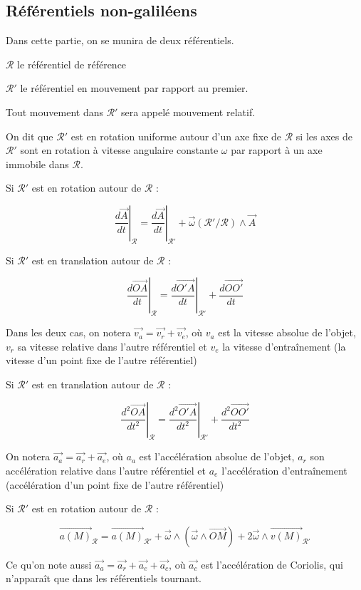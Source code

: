 \documentclass[a4paper,12pt]{book}
\newcommand{\Def}[2]{\begin{tcolorbox}[colback=white,colframe=red!10!green!20!blue!75!, title=Définition : #1]#2\end{tcolorbox}}
\newcommand{\Thr}[2]{\begin{tcolorbox}[sharp corners, colback=white,colframe=red!10!blue!30!green!75!, title=Théorème : #1]#2\end{tcolorbox}}
\renewcommand{\Vec}[1]{\overrightarrow{#1}}
\begin{document}
\subsection{Référentiels non-galiléens}
\Def{Référentiels}{Dans cette partie, on se munira de deux référentiels.
\par $\mathcal{R}$ le référentiel de référence
\par $\mathcal{R}'$ le référentiel en mouvement par rapport au premier.
\par Tout mouvement dans $\mathcal{R}'$ sera appelé mouvement relatif.
\par On dit que $\mathcal{R}'$ est en rotation uniforme autour d'un axe fixe de $\mathcal{R}$ si les axes de $\mathcal{R}'$ sont en rotation à vitesse angulaire constante $\omega$ par rapport à un axe immobile dans $\mathcal{R}$.}
\Thr{Composition des vitesses}{Si $\mathcal{R}'$ est en rotation autour de $\mathcal{R}$ :
\par $$\left.\dfrac{d\Vec{A}}{dt}\right|_\mathcal{R} = \left.\dfrac{d\Vec{A}}{dt}\right|_{\mathcal{R}'}+\Vec{\omega}(\mathcal{R}'/\mathcal{R})\wedge\Vec{A}$$
\par Si $\mathcal{R}'$ est en translation autour de $\mathcal{R}$ :
\par $$\left.\dfrac{d\Vec{OA}}{dt}\right|_\mathcal{R} = \left.\dfrac{d\Vec{O'A}}{dt}\right|_{\mathcal{R}'}+\dfrac{d\vec{OO'}}{dt}$$
\par Dans les deux cas, on notera $\Vec{v_a} = \Vec{v_r}+\Vec{v_e}$, où $v_a$ est la vitesse absolue de l'objet, $v_r$ sa vitesse relative dans l'autre référentiel et $v_e$ la vitesse d'entraînement (la vitesse d'un point fixe de l'autre référentiel)}
\Thr{Comporision des accélérations}{Si $\mathcal{R}'$ est en translation autour de $\mathcal{R}$ :
\par $$\left.\dfrac{d^2\Vec{OA}}{dt^2}\right|_\mathcal{R} = \left.\dfrac{d^2\Vec{O'A}}{dt^2}\right|_{\mathcal{R}'}+\dfrac{d^2\vec{OO'}}{dt^2}$$
\par On notera $\Vec{a_a} = \Vec{a_r}+\Vec{a_e}$, où $a_a$ est l'accélération absolue de l'objet, $a_r$ son accélération relative dans l'autre référentiel et $a_e$ l'accélération d'entraînement (accélération d'un point fixe de l'autre référentiel)
\par Si $\mathcal{R}'$ est en rotation autour de $\mathcal{R}$ :
\par $$\Vec{a(M)}_{\mathcal{R}} = \Vec{a(M)}_{\mathcal{R}'}+\Vec{\omega}\wedge(\Vec{\omega}\wedge\Vec{OM})+2\Vec{\omega}\wedge \Vec{v(M)}_{\mathcal{R}'}$$
\par Ce qu'on note aussi $\Vec{a_a}=\Vec{a_r}+\Vec{a_e}+\Vec{a_c}$, où $\Vec{a_c}$ est l'accélération de Coriolis, qui n'apparaît que dans les référentiels tournant.}
\end{document}
